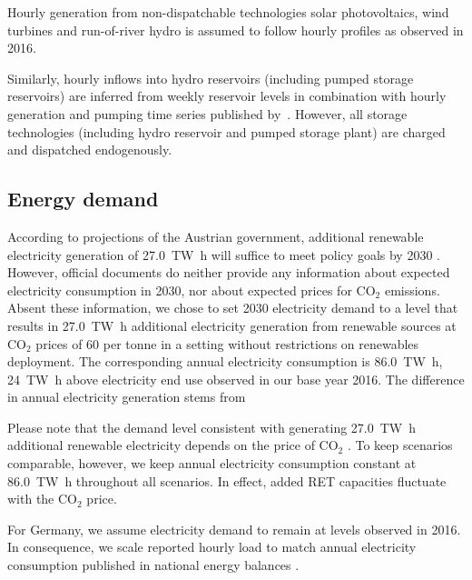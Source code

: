 \documentclass[final, 3p, times]{elsarticle} %
\newcommand{\COO}{\ensuremath{\mathrm{CO_2}} }
\begin{document}
    Hourly generation from non-dispatchable technologies solar photovoltaics, wind turbines and run-of-river hydro is
    assumed to follow hourly profiles as observed in 2016.

    Similarly, hourly inflows into hydro reservoirs (including pumped storage reservoirs) are inferred from weekly
    reservoir levels in combination with hourly generation and pumping time series published by~\cite{ENTSO-E2020}.
    However, all storage technologies (including hydro reservoir and pumped storage plant) are charged and dispatched
    endogenously.

    \subsection{Energy demand}\label{subsec:energy-demand}
    According to projections of the Austrian government, additional renewable electricity generation of
    \SI{27.0}{\tera\watt\hour} will suffice to meet policy goals by 2030 \citep{Regierungsprogramm2020}.
    However, official documents do neither provide any information about expected electricity consumption in 2030,
    nor about expected prices for \COO emissions.
    Absent these information, we chose to set 2030 electricity demand to a level that results in \SI{27.0}{\tera\watt\hour}
    additional electricity generation from renewable sources at \COO prices of 60 \EUR per tonne in a setting without
    restrictions on renewables deployment.
    The corresponding annual electricity consumption is \SI{86.0}{\tera\watt\hour}, \SI{24}{\tera\watt\hour} above
    electricity end use observed in our base year 2016.
    The difference in annual electricity generation stems from

    Please note that the demand level consistent with generating \SI{27.0}{\tera\watt\hour} additional renewable
    electricity depends on the price of \COO.
    To keep scenarios comparable, however, we keep annual electricity consumption constant at \SI{86.0}{\tera\watt\hour}
    throughout all scenarios.
    In effect, added RET capacities fluctuate with the \COO price.

    For Germany, we assume electricity demand to remain at levels observed in 2016.
    In consequence, we scale reported hourly load to match annual electricity consumption published in national energy
    balances \citep{AGEB}.
\end{document}

